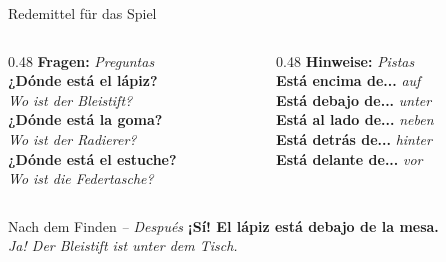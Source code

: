 \documentclass[aspectratio=169, 11pt]{beamer}
\newcommand{\de}[1]{{\small\textcolor{dunkelgrau}{\textit{#1}}}}
\newcommand{\estar}[1]{\textbf{\textcolor{blau}{#1}}}
\begin{document}
\begin{frame}{Redemittel für das Spiel}

\begin{columns}[T]
\begin{column}{0.48\textwidth}
\textbf{Fragen:} \de{Preguntas}\\[0.5em]
\estar{¿Dónde está el lápiz?}\\
{\footnotesize\textcolor{dunkelgrau}{\textit{Wo ist der Bleistift?}}}\\[0.4em]
\estar{¿Dónde está la goma?}\\
{\footnotesize\textcolor{dunkelgrau}{\textit{Wo ist der Radierer?}}}\\[0.4em]
\estar{¿Dónde está el estuche?}\\
{\footnotesize\textcolor{dunkelgrau}{\textit{Wo ist die Federtasche?}}}
\end{column}

\begin{column}{0.48\textwidth}
\textbf{Hinweise:} \de{Pistas}\\[0.5em]
\estar{Está \textbf{encima de}...} \de{auf}\\[0.4em]
\estar{Está \textbf{debajo de}...} \de{unter}\\[0.4em]
\estar{Está \textbf{al lado de}...} \de{neben}\\[0.4em]
\estar{Está \textbf{detrás de}...} \de{hinter}\\[0.4em]
\estar{Está \textbf{delante de}...} \de{vor}
\end{column}
\end{columns}

\vspace{0.5cm}

\begin{block}{Nach dem Finden \de{-- Después}}
\estar{¡Sí! El lápiz está debajo de la mesa.}\\
{\footnotesize\textcolor{dunkelgrau}{\textit{Ja! Der Bleistift ist unter dem Tisch.}}}
\end{block}

\end{frame}
\end{document}
